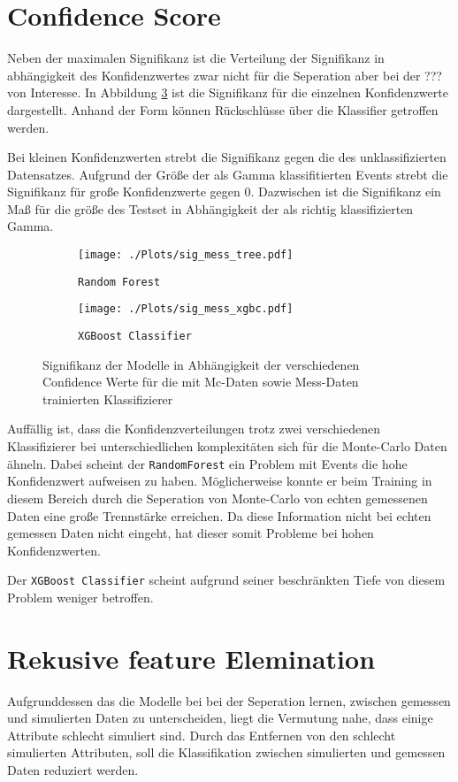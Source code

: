 \section{Confidence Score}
Neben der maximalen Signifikanz ist die Verteilung der Signifikanz in abhängigkeit des Konfidenzwertes zwar nicht für die Seperation aber bei der ??? von Interesse. 
In Abbildung \ref{fig:signconf} ist die Signifikanz für die einzelnen Konfidenzwerte dargestellt. 
Anhand der Form können Rückschlüsse über die Klassifier getroffen werden. 

Bei kleinen Konfidenzwerten strebt die Signifikanz gegen die des unklassifizierten Datensatzes.
Aufgrund der Größe der als Gamma klassifitierten Events strebt die Signifikanz für große Konfidenzwerte gegen 0.
Dazwischen ist die Signifikanz ein Maß für die größe des Testset in Abhängigkeit der als richtig klassifizierten Gamma.
\begin{figure}[H]
  \centering
  \begin{subfigure}[b]{0.48\textwidth}
  \centering
  \texttt{[image: ./Plots/sig\_mess\_tree.pdf]}
  \caption{\texttt{Random Forest}}
  \label{fig:signconfMC}
\end{subfigure}
\begin{subfigure}[b]{0.48\textwidth}
  \centering
  \texttt{[image: ./Plots/sig\_mess\_xgbc.pdf]}
  \caption{\texttt{XGBoost Classifier}}
  \label{fig:signconfMESS}
\end{subfigure}
\caption{Signifikanz der Modelle in Abhängigkeit der verschiedenen Confidence Werte für die mit Mc-Daten sowie Mess-Daten trainierten Klassifizierer}
\label{fig:signconf}
\end{figure}

Auffällig ist, dass die Konfidenzverteilungen trotz zwei verschiedenen Klassifizierer bei unterschiedlichen komplexitäten sich für die Monte-Carlo Daten ähneln.
Dabei scheint der \texttt{RandomForest} ein Problem mit Events die hohe Konfidenzwert aufweisen zu haben. 
Möglicherweise konnte er beim Training in diesem Bereich durch die Seperation von Monte-Carlo von echten gemessenen Daten eine große Trennstärke erreichen. 
Da diese Information nicht bei echten gemessen Daten nicht eingeht, hat dieser somit Probleme bei hohen Konfidenzwerten.

Der \texttt{XGBoost Classifier} scheint aufgrund seiner beschränkten Tiefe von diesem Problem weniger betroffen. 

\section{Rekusive feature Elemination}
Aufgrunddessen das die Modelle bei bei der Seperation lernen, zwischen gemessen und simulierten Daten zu unterscheiden, liegt die Vermutung nahe, dass einige Attribute schlecht simuliert sind.
Durch das Entfernen von den schlecht simulierten Attributen, soll die Klassifikation zwischen simulierten und gemessen Daten reduziert werden.

